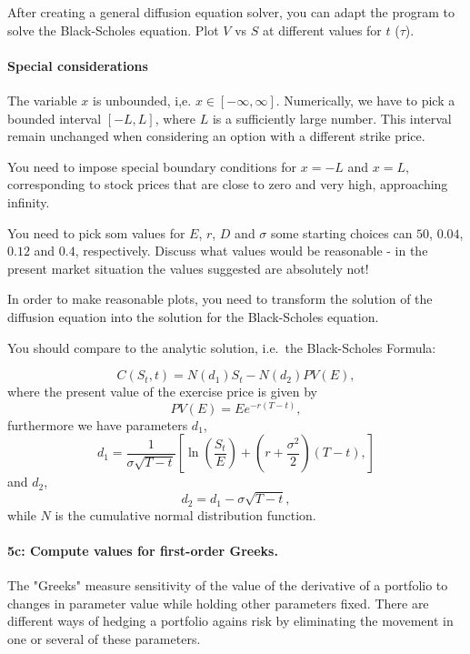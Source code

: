 \documentclass[%
oneside,                 %
final,                   %
10pt]{article}
\begin{document}
After creating a general diffusion equation solver, you
can adapt the program to solve the Black-Scholes equation.
Plot $V$ vs $S$ at different values for $t$ ($\tau$).

\paragraph{Special considerations}
The variable $x$ is unbounded, i,e. $x\in[-\infty, \infty]$. Numerically,
we have to pick a bounded interval $[-L, L]$, where $L$ is a sufficiently 
large number. This interval remain unchanged when considering an option with a
different strike price.

You need to impose special boundary conditions for $x=-L$ and $x=L$, corresponding 
to stock prices that are close to zero and very high, approaching infinity.

You need to pick som values for $E$, $r$, $D$ and $\sigma$ some starting
choices can $50$, $0.04$, $0.12$ and $0.4$, respectively. Discuss what 
values would be reasonable - in the present market situation the values 
suggested are absolutely not!

In order to make reasonable plots, you need to transform the solution of 
the diffusion equation into the solution for the Black-Scholes 
equation. 

You should compare to the analytic solution, i.e.~the Black-Scholes Formula:

\begin{equation}
    C(S_t, t) = N(d_1) S_t - N(d_2) PV(E),
\end{equation}
where the present value of the exercise price is
given by
\begin{equation}
    PV(E) = Ee^{-r(T - t)},
\end{equation}
furthermore we have parameters $d_1$,
\begin{equation}    
    d_1 = \frac{1}{\sigma \sqrt{T - t}}
    \left[
        \ln \left(\frac{S_t}{E} \right) 
        + \left(r + \frac{\sigma^2}{2} \right) (T - t),
    \right] 
\end{equation}
and $d_2$,
\begin{equation}
    d_2 = d_1 - \sigma \sqrt{T - t},
\end{equation}
while $N$ is the cumulative normal distribution function.


\paragraph{5c: Compute values for first-order Greeks.}
The "Greeks" measure sensitivity of the value of the derivative of 
a portfolio to changes in parameter value while holding other 
parameters fixed. There are different ways of hedging a portfolio
agains risk by eliminating the movement in one or several of
these parameters.
\end{document}
